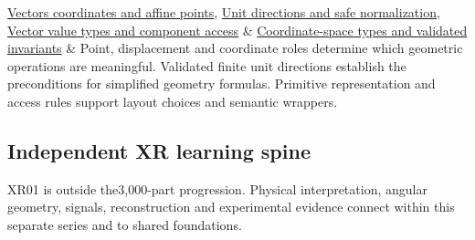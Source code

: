 {\begin{longtable}[]
\hyperref[appendix-0659864c0aa3]{Vectors coordinates and affine points}, \hyperref[appendix-f744e41b95b4]{Unit directions and safe normalization}, \hyperref[appendix-37a39984ba66]{Vector value types and component access} & \hyperref[appendix-380a220e2529]{Coordinate-space types and validated invariants} & Point, displacement and coordinate roles determine which geometric operations are meaningful. Validated finite unit directions establish the preconditions for simplified geometry formulas. Primitive representation and access rules support layout choices and semantic wrappers. \\
\end{longtable}
}

\subsection{Independent XR learning spine}\label{appendix-4ad47bdd269a-independent-xr-learning-spine}

\hypertarget{appendix-4ad47bdd269a-independent-xr-learning-spine}{}

XR01 is outside the3,000-part progression. Physical interpretation, angular geometry, signals, reconstruction and experimental evidence connect within this separate series and to shared foundations.

